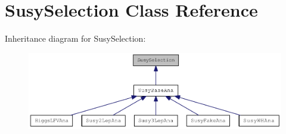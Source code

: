 \hypertarget{classSusySelection}{
\section{SusySelection Class Reference}
\label{classSusySelection}
}
Inheritance diagram for SusySelection:\nopagebreak
\begin{figure}[H]
\begin{center}
\leavevmode
\includegraphics[width=400pt]{classSusySelection__inherit__graph}
\end{center}
\end{figure}
